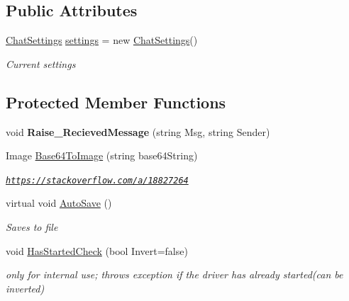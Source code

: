 \subsection*{Public Attributes}
\begin{DoxyCompactItemize}
\item 
\hyperlink{class_web_whatsapp_a_p_i_1_1_base_class_1_1_chat_settings}{Chat\+Settings} \hyperlink{class_web_whatsapp_a_p_i_1_1_base_class_af7b5c73d834b7c97f6aa1947310af34e}{settings} = new \hyperlink{class_web_whatsapp_a_p_i_1_1_base_class_1_1_chat_settings}{Chat\+Settings}()
\begin{DoxyCompactList}\small\item\em Current settings \end{DoxyCompactList}\end{DoxyCompactItemize}
\subsection*{Protected Member Functions}
\begin{DoxyCompactItemize}
\item 
\mbox{\label{class_web_whatsapp_a_p_i_1_1_base_class_a797576c847b00eee08dd92693bd522c4}} 
void {\bfseries Raise\+\_\+\+Recieved\+Message} (string Msg, string Sender)
\item 
Image \hyperlink{class_web_whatsapp_a_p_i_1_1_base_class_a3c18dac86c5b0a57ebfb1822e89518d8}{Base64\+To\+Image} (string base64\+String)
\begin{DoxyCompactList}\small\item\em \href{https://stackoverflow.com/a/18827264}{\tt https\+://stackoverflow.\+com/a/18827264} \end{DoxyCompactList}\item 
virtual void \hyperlink{class_web_whatsapp_a_p_i_1_1_base_class_a56a2f1cfc0bef6cad2aae521e9c4d20a}{Auto\+Save} ()
\begin{DoxyCompactList}\small\item\em Saves to file \end{DoxyCompactList}\item 
void \hyperlink{class_web_whatsapp_a_p_i_1_1_base_class_a69c20548bf1e5d5e2ed200f6d44222e5}{Has\+Started\+Check} (bool Invert=false)
\begin{DoxyCompactList}\small\item\em only for internal use; throws exception if the driver has already started(can be inverted) \end{DoxyCompactList}\end{DoxyCompactItemize}
